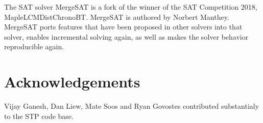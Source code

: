 \documentclass{easychair}
\begin{document}
The SAT solver MergeSAT is a fork of the winner of the SAT Competition 2018, MapleLCMDistChronoBT. MergeSAT is authored by Norbert Manthey. 
MergeSAT ports features that have been proposed in other solvers into that solver, enables incremental solving again, as well as makes the solver behavior reproducible again.

\section*{Acknowledgements}
Vijay Ganesh, Dan Liew, Mate Soos and Ryan Govostes contributed substantialy to the STP code base.




\vfill
\pagebreak
\end{document}
